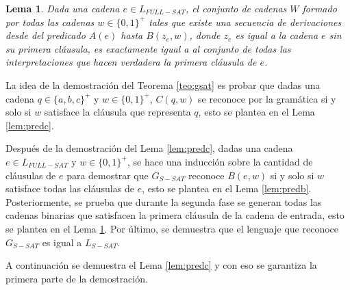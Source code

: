 \documentclass[12pt]{article}
\newtheorem{lemma}{Lema}
\begin{document}
\begin{lemma}
    \label{lem:preda}
    Dada una cadena $e\in L_{FULL-SAT}$, el conjunto de cadenas $W$ formado por todas las cadenas 
    $w\in \{0,1\}^+$ tales que existe una secuencia de derivaciones desde del predicado $A(e)$ hasta 
    $B(z_e,w)$, donde $z_e$ es igual a la cadena $e$ sin su primera cláusula, es exactamente igual a 
    al conjunto de todas las interpretaciones que hacen verdadera la primera cláusula de $e$.
\end{lemma}

La idea de la demostración del Teorema \ref{teo:gsat} es probar que dadas una cadena $q\in \{a,b,c\}^+$ y 
$w\in \{0,1\}^+$, $C(q,w)$ se reconoce por la gramática si y solo si $w$ satisface la cláusula que 
representa $q$, esto se plantea en el Lema \ref{lem:predc}. 

Después de la demostración del Lema \ref{lem:predc}, dadas una cadena $e\in L_{FULL-SAT}$ y $w\in \{0,1\}^+$, se hace una inducción sobre la cantidad de cláusulas de $e$ para demostrar que $G_{S-SAT}$ reconoce $B(e,w)$ si y solo si $w$ satisface todas las cláusulas de $e$, esto se plantea en el Lema \ref{lem:predb}. Posteriormente, se prueba que durante la segunda fase se generan todas las cadenas binarias que satisfacen la primera cláusula de la cadena de entrada, esto se plantea en el Lema \ref{lem:preda}. Por último, se demuestra que el lenguaje que reconoce $G_{S-SAT}$ es igual a $L_{S-SAT}$.

A continuación se demuestra el Lema \ref{lem:predc} y con eso se garantiza la primera parte de la demostración.
\end{document}

